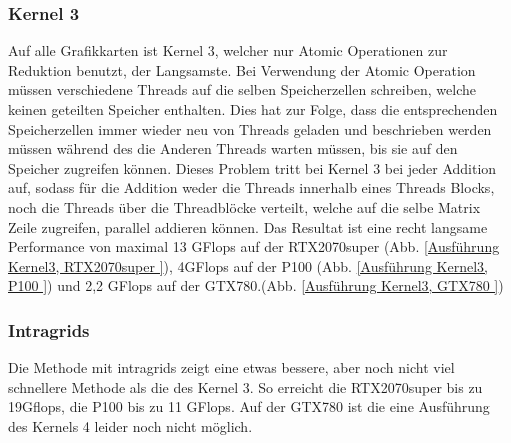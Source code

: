 \documentclass[10pt,a4paper]{article}
\begin{document}
	 \subsubsection{Kernel 3}
	 Auf alle Grafikkarten ist Kernel 3, welcher nur Atomic Operationen zur Reduktion benutzt, der Langsamste. Bei Verwendung der Atomic Operation müssen verschiedene Threads auf die selben Speicherzellen schreiben, welche keinen geteilten Speicher enthalten. Dies hat zur Folge, dass die entsprechenden Speicherzellen immer wieder neu von Threads geladen und beschrieben werden müssen während des die Anderen Threads warten müssen, bis sie auf den Speicher zugreifen können. Dieses Problem tritt bei Kernel 3 bei jeder Addition auf, sodass für die Addition weder die Threads innerhalb eines Threads Blocks, noch die Threads über die Threadblöcke verteilt, welche auf die selbe Matrix Zeile zugreifen, parallel addieren können. Das Resultat ist eine recht langsame Performance von maximal 13 GFlops auf der RTX2070super (Abb. \ref{Ausführung Kernel3, RTX2070super }), 4GFlops auf der P100 (Abb. \ref{Ausführung Kernel3, P100 }) und 2,2 GFlops auf der GTX780.(Abb. \ref{Ausführung Kernel3, GTX780 })\\
	 \subsubsection{Intragrids}
	 Die Methode mit intragrids zeigt eine etwas bessere, aber noch nicht viel schnellere Methode als die des Kernel 3. So erreicht die RTX2070super bis zu 19Gflops, die P100 bis zu 11 GFlops. Auf der GTX780 ist die eine Ausführung des Kernels 4 leider noch nicht möglich.\\
\end{document}
